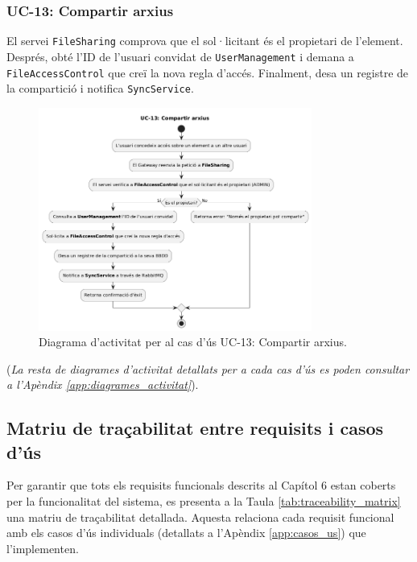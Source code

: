 \subsubsection{UC-13: Compartir arxius}
El servei \texttt{FileSharing} comprova que el sol·licitant és el propietari de l'element. Després, obté l'ID de l'usuari convidat de \texttt{UserManagement} i demana a \texttt{FileAccessControl} que creï la nova regla d'accés. Finalment, desa un registre de la compartició i notifica \texttt{SyncService}.

\begin{figure}[H]
    \centering
    \includegraphics[width=0.8\textwidth]{Figures/ad_UC13.png}
    \caption{Diagrama d'activitat per al cas d'ús UC-13: Compartir arxius.}
    \label{fig:ad_uc13}
\end{figure}

\par\noindent(\emph{La resta de diagrames d'activitat detallats per a cada cas d'ús es poden consultar a l'Apèndix \ref{app:diagrames_activitat}}).

\subsection{Matriu de traçabilitat entre requisits i casos d'ús}
Per garantir que tots els requisits funcionals descrits al Capítol 6 estan coberts per la funcionalitat del sistema, es presenta a la Taula \ref{tab:traceability_matrix} una matriu de traçabilitat detallada. Aquesta relaciona cada requisit funcional amb els casos d'ús individuals (detallats a l'Apèndix \ref{app:casos_us}) que l'implementen.

